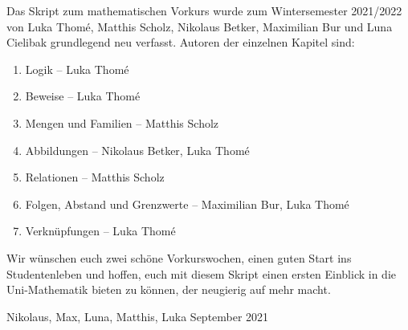 Das Skript zum mathematischen Vorkurs wurde zum Wintersemester 2021/2022 von Luka Thomé, Matthis Scholz, Nikolaus Betker, Maximilian Bur und Luna Cielibak grundlegend neu verfasst. Autoren der einzelnen Kapitel sind:
\begin{enumerate}[label={Kapitel \arabic*}, labelindent=1.5em, leftmargin=*]
    \item Logik -- Luka Thomé
    \item Beweise -- Luka Thomé
    \item Mengen und Familien -- Matthis Scholz
    \item Abbildungen -- Nikolaus Betker, Luka Thomé
    \item Relationen -- Matthis Scholz
    \item Folgen, Abstand und Grenzwerte -- Maximilian Bur, Luka Thomé
    \item Verknüpfungen -- Luka Thomé
\end{enumerate}
Wir wünschen euch zwei schöne Vorkurswochen, einen guten Start ins Studentenleben und hoffen, euch mit diesem Skript einen ersten Einblick in die Uni-Mathematik bieten zu können, der neugierig auf mehr macht.

\quad

Nikolaus, Max, Luna, Matthis, Luka \hfill September 2021
